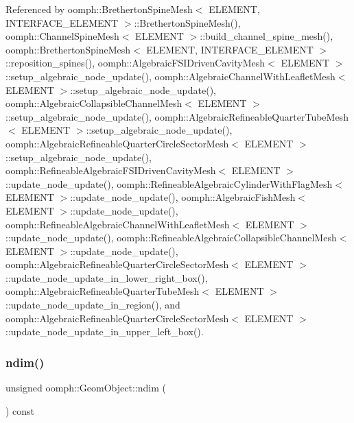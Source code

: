Referenced by oomph\+::\+Bretherton\+Spine\+Mesh$<$ E\+L\+E\+M\+E\+N\+T, I\+N\+T\+E\+R\+F\+A\+C\+E\+\_\+\+E\+L\+E\+M\+E\+N\+T $>$\+::\+Bretherton\+Spine\+Mesh(), oomph\+::\+Channel\+Spine\+Mesh$<$ E\+L\+E\+M\+E\+N\+T $>$\+::build\+\_\+channel\+\_\+spine\+\_\+mesh(), oomph\+::\+Bretherton\+Spine\+Mesh$<$ E\+L\+E\+M\+E\+N\+T, I\+N\+T\+E\+R\+F\+A\+C\+E\+\_\+\+E\+L\+E\+M\+E\+N\+T $>$\+::reposition\+\_\+spines(), oomph\+::\+Algebraic\+F\+S\+I\+Driven\+Cavity\+Mesh$<$ E\+L\+E\+M\+E\+N\+T $>$\+::setup\+\_\+algebraic\+\_\+node\+\_\+update(), oomph\+::\+Algebraic\+Channel\+With\+Leaflet\+Mesh$<$ E\+L\+E\+M\+E\+N\+T $>$\+::setup\+\_\+algebraic\+\_\+node\+\_\+update(), oomph\+::\+Algebraic\+Collapsible\+Channel\+Mesh$<$ E\+L\+E\+M\+E\+N\+T $>$\+::setup\+\_\+algebraic\+\_\+node\+\_\+update(), oomph\+::\+Algebraic\+Refineable\+Quarter\+Tube\+Mesh$<$ E\+L\+E\+M\+E\+N\+T $>$\+::setup\+\_\+algebraic\+\_\+node\+\_\+update(), oomph\+::\+Algebraic\+Refineable\+Quarter\+Circle\+Sector\+Mesh$<$ E\+L\+E\+M\+E\+N\+T $>$\+::setup\+\_\+algebraic\+\_\+node\+\_\+update(), oomph\+::\+Refineable\+Algebraic\+F\+S\+I\+Driven\+Cavity\+Mesh$<$ E\+L\+E\+M\+E\+N\+T $>$\+::update\+\_\+node\+\_\+update(), oomph\+::\+Refineable\+Algebraic\+Cylinder\+With\+Flag\+Mesh$<$ E\+L\+E\+M\+E\+N\+T $>$\+::update\+\_\+node\+\_\+update(), oomph\+::\+Algebraic\+Fish\+Mesh$<$ E\+L\+E\+M\+E\+N\+T $>$\+::update\+\_\+node\+\_\+update(), oomph\+::\+Refineable\+Algebraic\+Channel\+With\+Leaflet\+Mesh$<$ E\+L\+E\+M\+E\+N\+T $>$\+::update\+\_\+node\+\_\+update(), oomph\+::\+Refineable\+Algebraic\+Collapsible\+Channel\+Mesh$<$ E\+L\+E\+M\+E\+N\+T $>$\+::update\+\_\+node\+\_\+update(), oomph\+::\+Algebraic\+Refineable\+Quarter\+Circle\+Sector\+Mesh$<$ E\+L\+E\+M\+E\+N\+T $>$\+::update\+\_\+node\+\_\+update\+\_\+in\+\_\+lower\+\_\+right\+\_\+box(), oomph\+::\+Algebraic\+Refineable\+Quarter\+Tube\+Mesh$<$ E\+L\+E\+M\+E\+N\+T $>$\+::update\+\_\+node\+\_\+update\+\_\+in\+\_\+region(), and oomph\+::\+Algebraic\+Refineable\+Quarter\+Circle\+Sector\+Mesh$<$ E\+L\+E\+M\+E\+N\+T $>$\+::update\+\_\+node\+\_\+update\+\_\+in\+\_\+upper\+\_\+left\+\_\+box().

\mbox{\label{classoomph_1_1GeomObject_a0305c3102fa6f5042461afb600a082df}} 
\subsubsection{\texorpdfstring{ndim()}{ndim()}}
{\footnotesize\ttfamily unsigned oomph\+::\+Geom\+Object\+::ndim (\begin{DoxyParamCaption}{ }\end{DoxyParamCaption}) const\hspace{0.3cm}{\ttfamily [inline]}}



